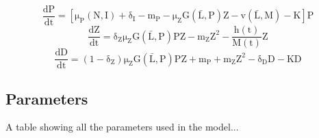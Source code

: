 \begin{equation}
    \label{eq:Pdynamics}
    \mathrm{\frac{dP}{dt} = \left[ \mu_P(N,I)+\delta_I-m_P-\mu_ZG(\bar{L},P)Z-v(\bar{L},M)-K \right] P}
\end{equation}
\begin{equation}
    \label{eq:Zdynamics}
    \mathrm{\frac{dZ}{dt} = \delta_Z\mu_Z G(\bar{L},P)PZ-m_Z Z^2 - \frac{h(t)}{M(t)}Z}
\end{equation}
\begin{equation}
    \label{eq:Ddynamics}
    \mathrm{\frac{dD}{dt} = (1-\delta_Z)\mu_Z G(\bar{L},P)PZ+m_P+m_Z Z^2-\delta_D D-KD}
\end{equation}
%
\subsection{Parameters}
A table showing all the parameters used in the model...

